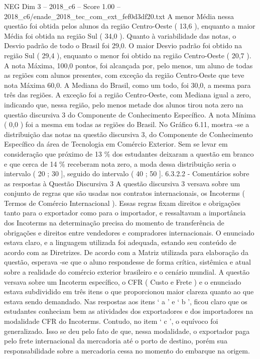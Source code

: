 \begin{textsample}{NEG Dim 3 – 2018\_c6 – Score 1.00 – 2018\_c6/enade\_2018\_tec\_com\_ext\_fef0d3df20.txt}
A menor Média nessa questão foi obtida pelos alunos da região Centro-Oeste ( 13,6 ), enquanto a maior Média foi obtida na região Sul ( 34,0 ).
Quanto à variabilidade das notas, o Desvio padrão de todo o Brasil foi 29,0.
O maior Desvio padrão foi obtido na região Sul ( 29,4 ), enquanto o menor foi obtido na região Centro-Oeste ( 20,7 ).
A nota Máxima, 100,0 pontos, foi alcançada por, pelo menos, um aluno de todas as regiões com alunos presentes, com exceção da região Centro-Oeste que teve nota Máxima 60,0.
A Mediana do Brasil, como um todo, foi 30,0, a mesma para três das regiões.
A exceção foi a região Centro-Oeste, com Mediana igual a zero, indicando que, nessa região, pelo menos metade dos alunos tirou nota zero na questão discursiva 3 do Componente de Conhecimento Específico.
A nota Mínima ( 0,0 ) foi a mesma em todas as regiões do Brasil.
No Gráfico 6.11, mostra -se a distribuição das notas na questão discursiva 3, do Componente de Conhecimento Específico da área de Tecnologia em Comércio Exterior.
Sem se levar em consideração que próximo de 13 \% dos estudantes deixaram a questão em branco e que cerca de 14 \% receberam nota zero, a moda dessa distribuição seria o intervalo ( 20 ; 30 ], seguido do intervalo ( 40 ; 50 ]. 6.3.2.2 - Comentários sobre as respostas à Questão Discursiva 3 A questão discursiva 3 versava sobre um conjunto de regras que são usadas nos contratos internacionais, os Incoterms ( Termos de Comércio Internacional ).
Essas regras fixam direitos e obrigações tanto para o exportador como para o importador, e ressaltavam a importância dos Incoterms na determinação precisa do momento de transferência de obrigações e direitos entre vendedores e compradores internacionais.
O enunciado estava claro, e a linguagem utilizada foi adequada, estando seu conteúdo de acordo com as Diretrizes.
De acordo com a Matriz utilizada para elaboração da questão, esperava -se que o aluno respondesse de forma crítica, sistêmica e atual sobre a realidade do comércio exterior brasileiro e o cenário mundial.
A questão versava sobre um Incoterm específico, o CFR ( Custo e Frete ) e o enunciado estava subdividido em três itens o que proporcionou maior clareza quanto ao que estava sendo demandado.
Nas respostas aos itens ‘ a ’ e ‘ b ’, ficou claro que os estudantes conheciam bem as atividades dos exportadores e dos importadores na modalidade CFR do Incoterms.
Contudo, no item ‘ c ’, o equívoco foi generalizado.
Isso se deu pelo fato de que, nessa modalidade, o exportador paga pelo frete internacional da mercadoria até o porto de destino, porém sua responsabilidade sobre a mercadoria cessa no momento do embarque na origem.

\end{textsample}
